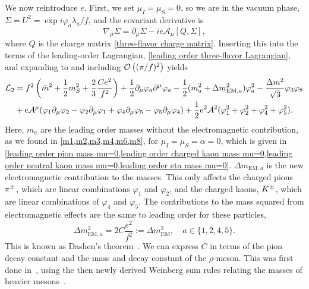 We now reintroduce $e$.
First, we set $\mu_I = \mu_S = 0$, so we are in the vacuum phase, $\Sigma = U^2 = \exp{i \varphi_a \lambda_a/f}$, and the covariant derivative is
%
\begin{equation}
    \nabla_\mu \Sigma = \partial_\mu \Sigma - i e \mathcal A_\mu [Q, \Sigma],
\end{equation}
%
where $Q$ is the charge matrix \autoref{three-flavor charge matrix}.
Inserting this into the terms of the leading-order Lagrangian, \autoref{leading order three-flavor Lagrangian}, and expanding to and including $\mathcal O\left((\pi/f)^2\right)$ yields
%
\begin{align}
    \nonumber
    \mathcal{L}_2
    &= 
    f^2 \left(\bar m^2 + \frac{1}{2} m_S^2 + \frac{2}{3}\frac{C e^2}{f^2}\right)
    +\frac{1}{2} \partial_\mu \varphi_a \partial^\mu \varphi_a
    - \frac{1}{2}(m_{a}^2 + \Delta m_{\text{EM},a}^2)\varphi_a^2
    - \frac{\Delta m^2}{\sqrt 3} \varphi_3 \varphi_8\\
    &+ e \mathcal A^\mu 
    (
        \varphi_1 \partial_\mu \varphi_2
        - \varphi_2 \partial_\mu \varphi_1
        + \varphi_4 \partial_\mu \varphi_5
        - \varphi_5 \partial_\mu \varphi_4
    )
    + \frac{1}{2} e^2 \mathcal A^2 (\varphi_1^2 +\varphi_2^2 + \varphi_4^2 +\varphi_5^2).
\end{align}
%
Here, $m_{a}$ are the leading order masses without the electromagnetic contribution, as we found in \cref{m1,m2,m3,m4,m6,m8}, for $\mu_I = \mu_S = \alpha = 0$, which is given in
\cref{leading order pion mass mu=0,leading order charged kaon mass mu=0,leading order neutral kaon mass mu=0,leading order eta mass mu=0}.
$\Delta m_{\text{EM}, a}$ is the new electromagnetic contribution to the masses.
This only affects the charged pions ${\pi^\pm}$, which are linear combinations $\varphi_1$ and $\varphi_2$, and the charged kaons, ${K^\pm}$, which are linear combinations of $\varphi_4$ and $\varphi_5$.
The contributions to the mass squared from electromagnetic effects are the same to leading order for these particles, 
%
\begin{equation}
    \Delta m_{\text{EM}, a}^2 = 2C \frac{e^2}{f^2} := \Delta m^2_\text{EM}, \quad a \in \{1, 2, 4, 5\}.
\end{equation}
%
This is known as Dashen's theorem~\autocite{dashenChiralMathrmSUEnsuremath1969}.
We can express $C$ in terms of the pion decay constant and the mass and decay constant of the $\rho$-meson.
This was first done in~\autocite{dasElectromagneticMassDifference1967}, using the then newly derived Weinberg sum rules relating the masses of heavier mesons~\autocite{weinbergPreciseRelationsSpectra1967}.
